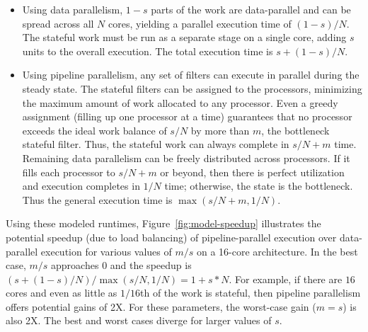 \begin{itemize}
\item Using data parallelism, $1-s$ parts of the work are
data-parallel and can be spread across all $N$ cores, yielding a
parallel execution time of $(1-s)/N$.  The stateful work must be run
as a separate stage on a single core, adding $s$ units to the overall
execution.  The total execution time is $s+(1-s)/N$.

\item Using pipeline parallelism, any set of filters can execute in
parallel during the steady state.  The stateful filters can be
assigned to the processors, minimizing the maximum amount of work
allocated to any processor.  Even a greedy assignment (filling up one
processor at a time) guarantees that no processor exceeds the ideal
work balance of $s/N$ by more than $m$, the bottleneck stateful
filter.  Thus, the stateful work can always complete in $s/N+m$ time.
Remaining data parallelism can be freely distributed across
processors.  If it fills each processor to $s/N+m$ or beyond, then
there is perfect utilization and execution completes in $1/N$ time;
otherwise, the state is the bottleneck.  Thus the general execution
time is $\max(s/N+m, 1/N)$.





\end{itemize}

Using these modeled runtimes, Figure~\ref{fig:model-speedup}
illustrates the potential speedup (due to load balancing) of
pipeline-parallel execution over data-parallel execution for various
values of $m/s$ on a 16-core architecture.  In the best case, $m/s$
approaches $0$ and the speedup is $(s+(1-s)/N)/\max(s/N, 1/N) =
1+s*N$.  For example, if there are $16$ cores and even as little as
$1/16$th of the work is stateful, then pipeline parallelism offers
potential gains of 2X.  For these parameters, the worst-case gain
($m=s$) is also 2X.  The best and worst cases diverge for larger
values of $s$.

